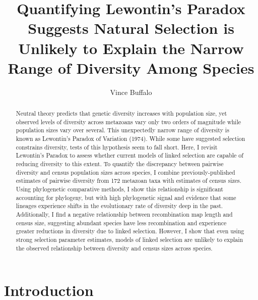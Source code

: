 \documentclass[9pt,lineno]{elife}
\title{Quantifying Lewontin's Paradox Suggests Natural Selection is Unlikely to Explain the Narrow Range of Diversity Among Species}
\author[1*]{Vince Buffalo}
\affil[1]{Institute of Ecology and Evolution, University of Oregon, United States}
\begin{document}
\maketitle

\begin{abstract}

 Neutral theory predicts that genetic diversity increases with population size,
 yet observed levels of diversity across metazoans vary only two orders of
 magnitude while population sizes vary over several. This unexpectedly narrow
 range of diversity is known as Lewontin's Paradox of Variation (1974). While
 some have suggested selection constrains diversity, tests of this hypothesis
 seem to fall short. Here, I revisit Lewontin's Paradox to assess whether
 current models of linked selection are capable of reducing diversity to this
 extent. To quantify the discrepancy between pairwise diversity and census
 population sizes across species, I combine previously-published estimates of
 pairwise diversity from 172 metazoan taxa with estimates of census sizes.
 Using phylogenetic comparative methods, I show this relationship is
 significant accounting for phylogeny, but with high phylogenetic signal and
 evidence that some lineages experience shifts in the evolutionary rate of
 diversity deep in the past. Additionally, I find a negative relationship
 between recombination map length and census size, suggesting abundant species
 have less recombination and experience greater reductions in diversity due to
 linked selection. However, I show that even using strong selection parameter
 estimates, models of linked selection are unlikely to explain the observed
 relationship between diversity and census sizes across species.
\end{abstract}


\section{Introduction}
\end{document}
